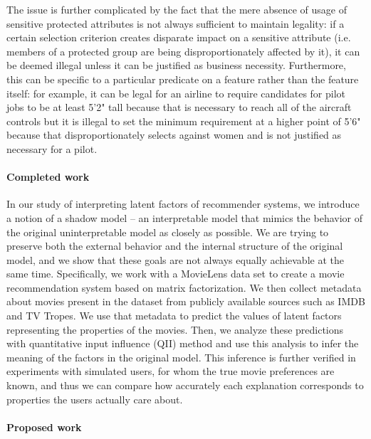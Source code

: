 The issue is further complicated by the fact that the mere absence of usage of
sensitive protected attributes is not always sufficient to maintain legality:
if a certain selection criterion creates disparate impact on a sensitive
attribute (i.e. members of a protected group are being disproportionately
affected by it), it can be deemed illegal unless it can be justified as business
necessity. Furthermore, this can be specific to a particular predicate on a
feature rather than the feature itself: for example, it can be legal for an
airline to require candidates for pilot jobs to be at least 5'2" tall because
that is necessary to reach all of the aircraft controls but it is illegal to
set the minimum requirement at a higher point of 5'6" because that
disproportionately selects against women and is not justified as necessary
for a pilot\cite{RoseMaryCourtCase}.

\paragraph{Completed work}

In our study of interpreting latent factors of recommender systems, we introduce
a notion of a shadow model -- an interpretable model that mimics the behavior
of the original uninterpretable model as closely as possible. We are trying to
preserve both the external behavior and the internal structure of the original
model, and we show that these goals are not always equally achievable at the
same time. Specifically, we work with a MovieLens data set to create a
movie recommendation system based on matrix factorization. We then collect
metadata about movies present in the dataset from publicly available sources
such as IMDB and TV Tropes. We use that metadata to predict the values of latent
factors representing the properties of the movies. Then, we analyze these
predictions with quantitative input influence (QII) method
\cite{datta2016algorithmic} and use this analysis to infer the meaning of the
factors in the original model. This inference is further verified in experiments
with simulated users, for whom the true movie preferences are known, and thus
we can compare how accurately each explanation corresponds to properties the
users actually care about.

\paragraph{Proposed work}

